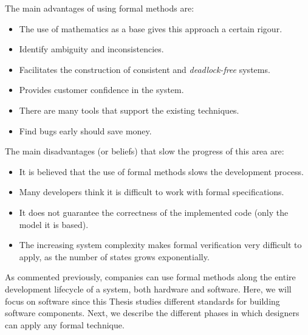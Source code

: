 The main advantages of using formal methods are:

\begin{itemize}
\item The use of mathematics as a base gives this approach a certain rigour.
\item Identify ambiguity and inconsistencies.
\item Facilitates the construction of consistent and \emph{deadlock-free} systems.
\item Provides customer confidence in the system.
\item There are many tools that support the existing techniques.
\item Find bugs early should save money.
\end{itemize} 

The main disadvantages (or beliefs) that slow the progress of this area are:

\begin{itemize}
\item It is believed that the use of formal methods slows the development process.
\item Many developers think it is difficult to work with formal specifications.
\item It does not guarantee the correctness of the implemented code (only the model
it is based).
\item The increasing system complexity makes formal verification very difficult to apply, as the number of states grows exponentially.
\end{itemize}

As commented previously, companies can use formal methods along the entire
development lifecycle of a system, both hardware and software. 
Here, we will focus on software since this Thesis studies different standards for building software components. 
Next, we describe the different phases in which designers can apply any formal technique. 

